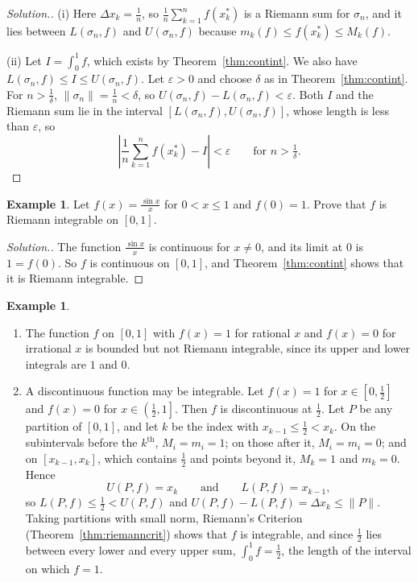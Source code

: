 \documentclass[11pt,a4paper]{article}
\numberwithin{equation}{section}
\theoremstyle{definition}
\newtheorem{exa}[thm]{Example}
\newenvironment{solution}
  {\renewcommand{\qedsymbol}{}\begin{proof}[\textit{Solution}.]}
  {\end{proof}}
\begin{document}
\begin{solution}
(i) Here $\Delta x_k = \frac{1}{n}$, so $\frac{1}{n}\sum_{k=1}^n f(x_k^*)$ is a Riemann sum for $\sigma_n$, and it lies between $L(\sigma_n,f)$ and $U(\sigma_n,f)$ because $m_k(f)\leq f(x^*_k)\leq M_k(f)$.

(ii) Let $I = \int_0^1 f$, which exists by Theorem~\ref{thm:contint}. We also have $L(\sigma_n,f)\leq I\leq U(\sigma_n,f)$. Let $\varepsilon>0$ and choose $\delta$ as in Theorem~\ref{thm:contint}. For $n>\frac{1}{\delta}$, $\|\sigma_n\| = \frac{1}{n}<\delta$, so $U(\sigma_n,f) - L(\sigma_n,f)<\varepsilon$. Both $I$ and the Riemann sum lie in the interval $[L(\sigma_n,f), U(\sigma_n,f)]$, whose length is less than $\varepsilon$, so
$$\left|\frac{1}{n}\sum_{k=1}^n f(x^*_k) - I\right|<\varepsilon \qquad\text{for } n>\tfrac{1}{\delta}.$$
\end{solution}


\begin{exa}
Let $f(x) = \frac{\sin x}{x}$ for $0<x\leq1$ and $f(0) = 1$. Prove that $f$ is Riemann integrable on $[0,1]$.
\end{exa}

\begin{solution}
The function $\frac{\sin x}{x}$ is continuous for $x\neq 0$, and its limit at $0$ is $1 = f(0)$. So $f$ is continuous on $[0,1]$, and Theorem~\ref{thm:contint} shows that it is Riemann integrable.
\end{solution}


\begin{exa}
\begin{enumerate}
\item[(i)] The function $f$ on $[0,1]$ with $f(x) = 1$ for rational $x$ and $f(x) = 0$ for irrational $x$ is bounded but not Riemann integrable, since its upper and lower integrals are $1$ and $0$.

\item[(ii)] A discontinuous function may be integrable. Let $f(x) = 1$ for $x\in \left[0, \frac{1}{2}\right]$ and $f(x) = 0$ for $x\in \left(\frac{1}{2}, 1\right]$. Then $f$ is discontinuous at $\frac{1}{2}$. Let $P$ be any partition of $[0,1]$, and let $k$ be the index with $x_{k-1}\leq\frac{1}{2}<x_k$. On the subintervals before the $k^{\text{th}}$, $M_i = m_i = 1$; on those after it, $M_i = m_i = 0$; and on $[x_{k-1},x_k]$, which contains $\frac{1}{2}$ and points beyond it, $M_k = 1$ and $m_k = 0$. Hence
$$U(P,f) = x_k\qquad\text{and}\qquad L(P,f) = x_{k-1},$$
so $L(P,f)\leq\frac{1}{2}<U(P,f)$ and $U(P,f) - L(P,f) = \Delta x_k\leq\|P\|$. Taking partitions with small norm, Riemann's Criterion (Theorem~\ref{thm:riemanncrit}) shows that $f$ is integrable, and since $\frac{1}{2}$ lies between every lower and every upper sum, $\int^1_0 f = \frac{1}{2}$, the length of the interval on which $f = 1$.
\end{enumerate}
\end{exa}
\end{document}
